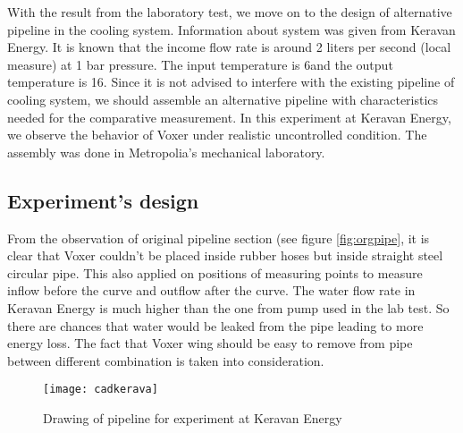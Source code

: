 With the result from the laboratory test, we move on to the design of alternative pipeline in the cooling system. Information about system was given from Keravan Energy. It is known that the income flow rate is around 2 liters per second (local measure) at 1 bar pressure. The input temperature is 6\celsius and the output temperature is 16\celsius. 
Since it is not advised to interfere with the existing pipeline of cooling system, we should assemble an alternative pipeline with characteristics needed for the comparative measurement. In this experiment at Keravan Energy, we observe the behavior of Voxer under realistic uncontrolled condition. The assembly was done in Metropolia's mechanical laboratory.  

\subsection{Experiment's design}

From the observation of original pipeline section (see figure \vref{fig:orgpipe}, it is clear that Voxer couldn't be placed inside rubber hoses but inside straight steel circular pipe. This also applied on positions of measuring points to measure inflow before the curve and outflow after the curve. The water flow rate in Keravan Energy is much higher than the one from pump used in the lab test. So there are chances that water would be leaked from the pipe leading to more energy loss. The fact that Voxer wing should be easy to remove from pipe between different combination is taken into consideration.

\begin{figure}[h]
  \centering
  \texttt{[image: cadkerava]}
  \caption{ Drawing of pipeline for experiment at Keravan Energy}
  \label{fig:cadkerava}
\end{figure}

